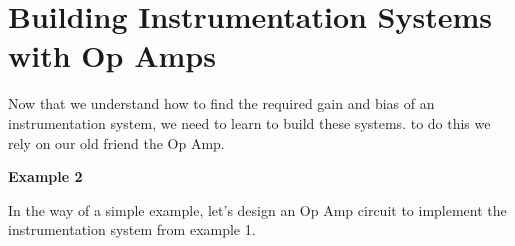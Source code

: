 \documentclass{handout}
\begin{document}

\newpage
\clearpage
\pagebreak

\section{Building Instrumentation Systems with Op Amps}
Now that we understand how to find the required gain and bias of an instrumentation system, we need to learn to build these systems.  to do this we rely on our old friend the Op Amp.

\textbf{Example 2}

In the way of a simple example, let's design an Op Amp circuit to implement the instrumentation system from example 1.
\end{document}
